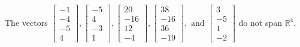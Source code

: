 \begin{exercise}
\begin{exerciseStatement}
  \end{exerciseStatement}
  \begin{exerciseAnswer}
   The vectors \(\left[\begin{array}{r}
-1 \\
-4 \\
-5 \\
4
\end{array}\right] , \left[\begin{array}{r}
-5 \\
4 \\
-3 \\
1
\end{array}\right] , \left[\begin{array}{r}
20 \\
-16 \\
12 \\
-4
\end{array}\right] , \left[\begin{array}{r}
38 \\
-16 \\
36 \\
-19
\end{array}\right] , \text{ and } \left[\begin{array}{r}
3 \\
-5 \\
1 \\
-2
\end{array}\right]\) 
  	 do not  
	span \(\mathbb{R}^4\).
  


  \end{exerciseAnswer}
\end{exercise}